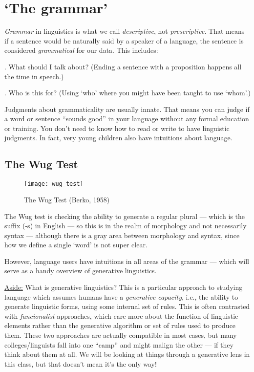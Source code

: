 
\section{`The grammar'}

\emph{Grammar} in linguistics is what we call \emph{descriptive}, not \emph{prescriptive}. That means if a sentence would be naturally said by a speaker of a language, the sentence is considered \emph{grammatical} for our data. This includes:

\ex. What should I talk about? (Ending a sentence with a proposition happens all the time in speech.)

\ex. Who is this for? (Using `who' where you might have been taught to use `whom'.)

Judgments about grammaticality are usually innate. That means you can judge if a word or sentence ``sounds good'' in your language without any formal education or training.
You don't need to know how to read or write to have linguistic judgments.
In fact, very young children also have intuitions about language.

\subsection{The Wug Test}

\begin{figure}[htbp]
	\centering
	\texttt{[image: wug\_test]}
	\caption{The Wug Test (Berko, 1958)}
\end{figure}

The Wug test is checking the ability to generate a regular plural --- which is the suffix (-s) in English --- so this is in the realm of morphology and not necessarily syntax --- although there is a gray area between morphology and syntax, since how we define a single `word' is not super clear.

However, language users have intuitions in all areas of the grammar --- which will serve as a handy overview of generative linguistics.

\underline{Aside:} What is generative linguistics? This is a particular approach to studying language which assumes humans have a \emph{generative capacity}, i.e., the ability to generate linguistic forms, using some internal set of rules. This is often contrasted with \emph{funcionalist} approaches, which care more about the function of linguistic elements rather than the generative algorithm or set of rules used to produce them. These two approaches are actually compatible in most cases, but many colleges/linguists fall into one ``camp'' and might malign the other --- if they think about them at all. We will be looking at things through a generative lens in this class, but that doesn't mean it's the only way! 

